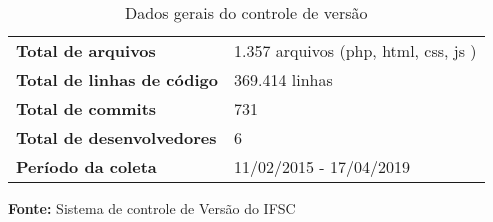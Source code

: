 \begin{table}
\caption{Dados gerais do controle de versão}
\label{quadro_git_ingresso}
\centering
\begin{tabular}{ l l }
   \cline{1-1}\cline{2-2}  
    \multicolumn{1}{|p{5.850cm}|}{\textbf{Total de arquivos}} &
    \multicolumn{1}{p{8.217cm}|}{1.357 arquivos (php, html, css, js )}
  \\ 
   \cline{1-1}\cline{2-2}  
    \multicolumn{1}{|p{5.850cm}|}{\textbf{Total de linhas de código}} &
    \multicolumn{1}{p{8.217cm}|}{369.414 linhas}
  \\    
   \cline{1-1}\cline{2-2}  
    \multicolumn{1}{|p{5.850cm}|}{\textbf{Total de commits}} &
    \multicolumn{1}{p{8.217cm}|}{731}
  \\    
   \cline{1-1}\cline{2-2}  
    \multicolumn{1}{|p{5.850cm}|}{\textbf{Total de desenvolvedores}} &
    \multicolumn{1}{p{8.217cm}|}{6}
  \\     
   \cline{1-1}\cline{2-2}  
    \multicolumn{1}{|p{5.850cm}|}{\textbf{Período da coleta}} &
    \multicolumn{1}{p{8.217cm}|}{11/02/2015 - 17/04/2019}
  \\       
  \hline

 \end{tabular} 
 \par\medskip\textbf{Fonte:} Sistema de controle de Versão do IFSC \par\medskip
\end{table}